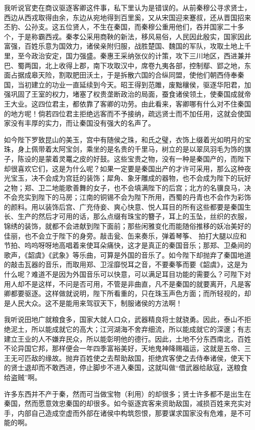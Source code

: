 \documentclass[12pt,UTF-8,openany]{ctexbook}
\begin{document}
\begin{normalsize}
    
    我听说官吏在商议驱逐客卿这件事，私下里认为是错误的。从前秦穆公寻求贤士，西边从西戎取得由余，东边从宛地得到百里奚，又从宋国迎来蹇叔，还从晋国招来丕豹、公孙支。这五位贤人，不生在秦国，而秦穆公重用他们，吞并国家二十多个，于是称霸西戎。秦孝公采用商鞅的新法，移风易俗，人民因此殷实，国家因此富强，百姓乐意为国效力，诸侯亲附归服，战胜楚国、魏国的军队，攻取土地上千里，至今政治安定，国力强盛。秦惠王采纳张仪的计策，攻下三川地区，西进兼并巴、蜀两国，北上收得上郡，南下攻取汉中，席卷九夷各部，控制鄢、郢之地，东面占据成皋天险，割取肥田沃土，于是拆散六国的合纵同盟，使他们朝西侍奉秦国，当初建立的功业一直延续到今天。昭王得到范雎，废黜穰侯，驱逐华阳君，加强巩固了王室的权力，堵塞了权贵垄断政治的局面，蚕食诸侯领土，使秦国成就帝王大业。这四位君主，都依靠了客卿的功劳。由此看来，客卿哪有什么对不住秦国的地方呢！倘若四位君主拒绝远客而不予接纳，疏远贤士而不加任用，这就会使国家没有丰厚的实力，而让秦国没有强大的名声了。
    
    如今陛下罗致昆山的美玉，宫中有随侯之珠，和氏之璧，衣饰上缀着光如明月的宝珠，身上佩带着太阿宝剑，乘坐的是名贵的千里马，树立的是以翠凤羽毛为饰的旗子，陈设的是蒙着灵鼍之皮的好鼓。这些宝贵之物，没有一种是秦国产的，而陛下却很喜欢它们，这是为什么呢？如果一定要是秦国出产的才许可采用，那么这种夜光宝玉，决不会成为宫廷的装饰；犀角、象牙雕成的器物，也不会成为陛下的玩好之物；郑、卫二地能歌善舞的女子，也不会填满陛下的后宫；北方的名骥良马，决不会充实到陛下的马房；江南的铜锡不会为陛下所用，西蜀的丹青也不会作为彩饰的颜料。用以装饰后宫、广充侍妾、爽心快意、悦人耳目的所有这些都要是秦国生长、生产的然后才可用的话，那么点缀有珠宝的簪子，耳上的玉坠，丝织的衣服，锦绣的装饰，就都不会进献到陛下面前；那些闲雅变化而能随俗推移的妖冶美好的佳丽，也不会立于陛下的身旁。敲击瓮、缶来奏乐，弹着琴筝、 拍打大腿以应和节拍、呜呜呀呀地高唱着来使耳朵痛快，这才是真正的秦国音乐；那郑、卫桑间的歌声，《韶虞》《武象》等乐曲，可算是外国的音乐了。如今陛下却抛弃了秦国地道的敲击瓦器的音乐，而取用郑、卫淫靡悦耳之音，不要秦筝而要《韶虞》，这是为什么呢？难道不是因为外国音乐可以快意，可以满足耳目功能的需要么？可陛下对用人却不是这样，不问是否可用，不管是非曲直，凡不是秦国的就要离开，凡是客卿都要驱逐。这样做就说明，陛下所看重的，只在珠玉声色方面；而所轻视的，却是人民大众。这不是能用来驾驭天下，制服诸侯的方法啊！
    
    我听说田地广就粮食多，国家大就人口众，武器精良将士就骁勇。因此，泰山不拒绝泥土，所以能成就它的高大；江河湖海不舍弃细流，所以能成就它的深邃；有志建立王业的人不嫌弃民众，所以能彰明他的德行。因此，土地不分东西南北，百姓不论异国它邦，那样便会一年四季富裕美好，天地鬼神降赐福运，这就是五帝、三王无可匹敌的缘故。抛弃百姓使之去帮助敌国，拒绝宾客使之去侍奉诸侯，使天下的贤士退却而不敢西进，停止脚步不进入秦国，这就叫做“借武器给敌寇，送粮食给盗贼”啊。
    
    许多东西并不产于秦，然而可当做宝物（利用）的却很多；贤士许多都不是出生在秦国，然而愿意效忠秦国的却很多。如今驱逐宾客来资助敌国，减损百姓来充实对手，内部自己造成空虚而外部在诸侯中构筑怨恨，那要谋求国家没有危难，是不可能的啊。
    
\end{normalsize}
\end{document}
